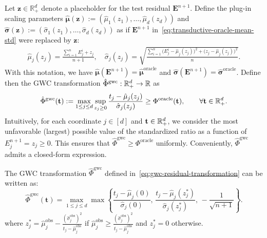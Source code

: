 Let $\mathbf z \in \mathbb{R}^d_+$ denote a placeholder for the test residual $\mathbf{E}^{n+1}$. 
Define the plug-in scaling parameters $\boldsymbol{\hat{\mu}}(\mathbf z) := (\hat{\mu}_1(z_1), \ldots, \hat{\mu}_d(z_d))$ and $\boldsymbol{\hat{\sigma}}(\mathbf z):= (\hat{\sigma}_1(z_1), \ldots, \hat{\sigma}_d(z_d))$ as if $\mathbf{E}^{n+1}$ in~\eqref{eq:transductive-oracle-mean-std} were replaced by $\mathbf z$:
\begin{align} \label{eq:placeholder-mean-std}
\hat{\mu}_j(z_j) = \frac{\sum_{i=1}^{n} {E}^i_j + z_j}{n+1}, 
\quad
\hat{\sigma}_j(z_j) = \sqrt{\frac{\sum_{i=1}^{n} \!\bigl({E}^i_j - \hat{\mu}_j(z_j)\bigr)^2 + \bigl(z_j - \hat{\mu}_j(z_j)\bigr)^2}{n} }.
\end{align}
With this notation, we have $\boldsymbol{\hat{\mu}}(\mathbf{E}^{n+1}) = \hat{\boldsymbol{\mu}}^{\mathrm{oracle}}$ and $\boldsymbol{\hat{\sigma}}(\mathbf{E}^{n+1}) = \hat{\boldsymbol{\sigma}}^{\mathrm{oracle}}$.
Define then the GWC transformation $\hat{\Phi}^{\mathrm{gwc}}: \mathbb{R}^d_+ \to \mathbb{R}$ as
\begin{equation}
\hat{\Phi}^{\mathrm{gwc}}(\mathbf t)
:= 
\max_{1 \le j \le d} 
\sup_{z_j \ge 0} 
\frac{t_j - \hat{\mu}_j(z_j)}{\hat{\sigma}_j(z_j)} \geq \Phi^\mathrm{oracle}(\mathbf t), \qquad\forall \mathbf t \in \mathbb{R}^d_+.
\label{eq:gwc-residual-transformation}
\end{equation}
Intuitively, for each coordinate $j \in [d]$ and $\mathbf t \in \mathbb{R}^d_+$, we consider the most unfavorable (largest) possible value of the standardized ratio as a function of ${E}^{n+1}_j = z_j\geq 0$. 
This ensures that $\hat{\Phi}^{\mathrm{gwc}}\geq \Phi^\mathrm{oracle}$ uniformly.
Conveniently, $\hat{\Phi}^{\mathrm{gwc}}$ admits a closed-form expression.

\begin{lemma}
\label{lem:gwc-rescaling}
The GWC transformation $\hat{\Phi}^{\mathrm{gwc}}$ defined in~\eqref{eq:gwc-residual-transformation} can be written as:
\[
\hat{\Phi}^{\mathrm{gwc}}(\mathbf t)
= 
\max_{1 \le j \le d} 
\max\!\left\{
\frac{t_j - \hat{\mu}_j(0)}{\hat{\sigma}_j(0)},\,
\frac{t_j - \hat{\mu}_j(z_j^*)}{\hat{\sigma}_j(z_j^*)},\,
-\frac{1}{\sqrt{n+1}}
\right\}.
\]
where $z^*_j = \hat\mu^\mathrm{obs}_j - \frac{(\hat{\sigma}^\mathrm{obs}_j)^2}{t_j-\hat\mu^\mathrm{obs}_j}$ if $\hat\mu^\mathrm{obs}_j \geq \frac{(\hat{\sigma}^\mathrm{obs}_j)^2}{t_j-\hat\mu^\mathrm{obs}_j}$ and $z^*_j = 0$ otherwise.
\end{lemma}


